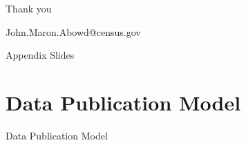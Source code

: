 \begin{transitionframe}
  \begin{center}
    \Huge Thank  you
  \end{center}
    \begin{center}
    John.Maron.Abowd@census.gov
  \end{center}

\end{transitionframe}




\appendix

\begin{transitionframe}
  \begin{center}
    \Huge Appendix Slides
  \end{center}
\end{transitionframe}

\section{Data Publication Model}
\begin{transitionframe}
  \begin{center}
    \Huge Data Publication Model
  \end{center}
\end{transitionframe}



